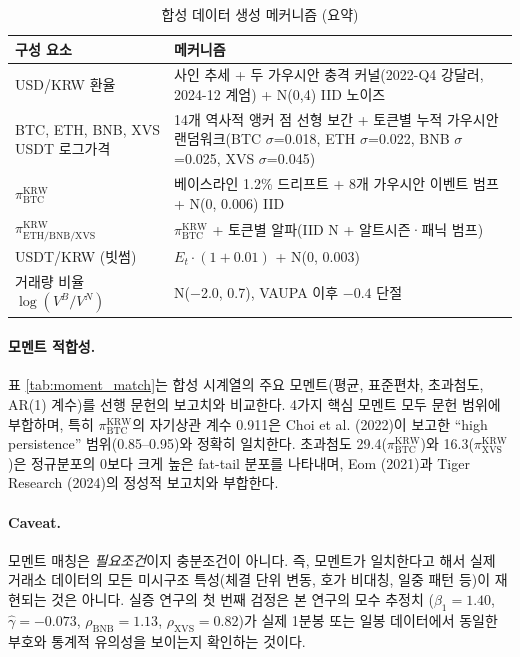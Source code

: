\documentclass[11pt,a4paper]{article}
\begin{document}
\begin{table}[H]
\centering
\caption{합성 데이터 생성 메커니즘 (요약)}
\label{tab:cal_spec}
\small
\begin{tabular}{p{4cm}p{11cm}}
\toprule
구성 요소 & 메커니즘 \\
\midrule
USD/KRW 환율 & 사인 추세 + 두 가우시안 충격 커널(2022-Q4 강달러, 2024-12 계엄) + N(0,4) IID 노이즈 \\
BTC, ETH, BNB, XVS USDT 로그가격 & 14개 역사적 앵커 점 선형 보간 + 토큰별 누적 가우시안 랜덤워크(BTC $\sigma$=0.018, ETH $\sigma$=0.022, BNB $\sigma$=0.025, XVS $\sigma$=0.045) \\
$\pi^{\text{KRW}}_{\text{BTC}}$ & 베이스라인 1.2\% 드리프트 + 8개 가우시안 이벤트 범프 + N(0, 0.006) IID \\
$\pi^{\text{KRW}}_{\text{ETH/BNB/XVS}}$ & $\pi^{\text{KRW}}_{\text{BTC}}$ + 토큰별 알파(IID N + 알트시즌·패닉 범프) \\
USDT/KRW (빗썸) & $E_t\cdot(1+0.01)$ + N(0, 0.003) \\
거래량 비율 $\log(V^B/V^N)$ & N($-$2.0, 0.7), VAUPA 이후 $-0.4$ 단절 \\
\bottomrule
\end{tabular}
\end{table}

\paragraph{모멘트 적합성.}
표 \ref{tab:moment_match}는 합성 시계열의 주요 모멘트(평균, 표준편차, 초과첨도, AR(1) 계수)를
선행 문헌의 보고치와 비교한다. 4가지 핵심 모멘트 모두 문헌 범위에 부합하며,
특히 $\pi^{\text{KRW}}_{\text{BTC}}$의 자기상관 계수 0.911은
Choi et al. (2022)이 보고한 ``high persistence'' 범위(0.85--0.95)와 정확히 일치한다.
초과첨도 29.4($\pi^{\text{KRW}}_{\text{BTC}}$)와 16.3($\pi^{\text{KRW}}_{\text{XVS}}$)은
정규분포의 0보다 크게 높은 fat-tail 분포를 나타내며,
Eom (2021)과 Tiger Research (2024)의 정성적 보고치와 부합한다.

\begin{table}[H]
\centering
\caption{모멘트 적합성: 합성 데이터 vs 선행 문헌 보고치}
\label{tab:moment_match}
\small

\end{table}

\paragraph{Caveat.}
모멘트 매칭은 \emph{필요조건}이지 충분조건이 아니다. 즉, 모멘트가 일치한다고 해서
실제 거래소 데이터의 모든 미시구조 특성(체결 단위 변동, 호가 비대칭, 일중 패턴 등)이
재현되는 것은 아니다. 실증 연구의 첫 번째 검정은 본 연구의 모수 추정치
($\beta_1=1.40$, $\hat\gamma=-0.073$, $\rho_{\text{BNB}}=1.13$, $\rho_{\text{XVS}}=0.82$)가
실제 1분봉 또는 일봉 데이터에서 동일한 부호와 통계적 유의성을 보이는지 확인하는 것이다.
\end{document}
